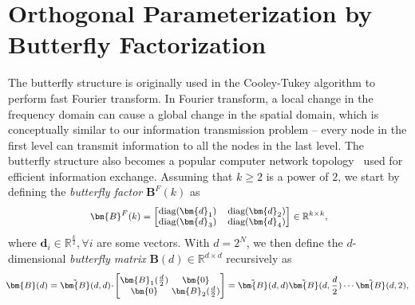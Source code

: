\vspace{-1.5mm}
\section{Orthogonal Parameterization by Butterfly Factorization}
\vspace{-1.5mm}



The butterfly structure is originally used in the Cooley-Tukey algorithm to perform fast Fourier transform. In Fourier transform, a local change in the frequency domain can cause a global change in the spatial domain, which is conceptually similar to our information transmission problem -- every node in the first level can transmit information to all the nodes in the last level. The butterfly structure also becomes a popular computer network topology~\cite{solihin2015fundamentals,li2011linear} used for efficient information exchange. Assuming that $k\geq 2$ is a power of $2$, we start by defining the \emph{butterfly factor} $\bm{B}^F(k)$ as
\begin{equation}\label{eq:but_factor}
\footnotesize
\begin{aligned}
    \bm{B}^F(k)=\begin{bmatrix}
    \text{diag}(\bm{d}_1) & \text{diag}(\bm{d}_2) \\
    \text{diag}(\bm{d}_3) & \text{diag}(\bm{d}_4)
    \end{bmatrix}\in\mathbb{R}^{k\times k},
\end{aligned}
\end{equation}
where $\bm{d}_i\in\mathbb{R}^{\frac{k}{2}},\forall i$ are some vectors. With $d=2^N$, we then define the $d$-dimensional \emph{butterfly matrix} $\bm{B}(d)\in\mathbb{R}^{d\times d}$ recursively as
\begin{equation}
\footnotesize
\begin{aligned}
    \!\!\bm{B}(d)=\tilde{\bm{B}}(d,d)\!\cdot\!\begin{bmatrix}
    \bm{B}_1(\frac{d}{2})\!\!\!\!\! & \bm{0} \\
    \bm{0}\!\!\!\!\! &\bm{B}_2(\frac{d}{2})
    \end{bmatrix}= \tilde{\bm{B}}(d,d)\tilde{\bm{B}}(d,\frac{d}{2})\cdots\tilde{\bm{B}}(d,2),
\end{aligned}
\end{equation}
